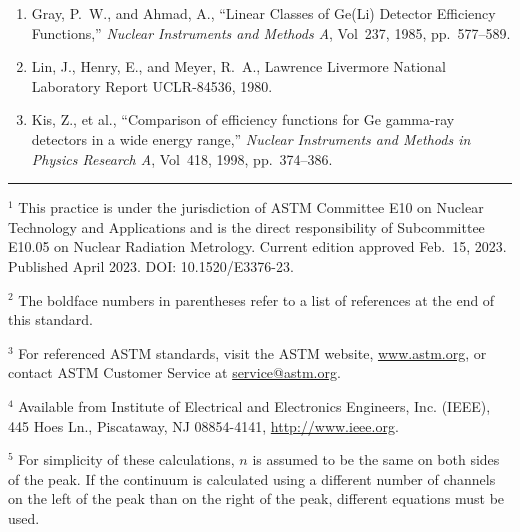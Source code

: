 \documentclass[12pt]{article}
\begin{document}
\begin{enumerate}[label=(\arabic*),leftmargin=3em]
  \item Gray, P.~W., and Ahmad, A., ``Linear Classes of Ge(Li) Detector Efficiency
        Functions,'' \textit{Nuclear Instruments and Methods A}, Vol~237, 1985,
        pp.~577--589.

  \item Lin, J., Henry, E., and Meyer, R.~A., Lawrence Livermore National Laboratory
        Report UCLR-84536, 1980.

  \item Kis, Z., et al., ``Comparison of efficiency functions for Ge gamma-ray detectors
        in a wide energy range,'' \textit{Nuclear Instruments and Methods in Physics
        Research A}, Vol~418, 1998, pp.~374--386.
\end{enumerate}

\vspace{2em}
\noindent\rule{\textwidth}{0.4pt}

\noindent\footnotesize
$^{1}$ This practice is under the jurisdiction of ASTM Committee E10 on Nuclear
Technology and Applications and is the direct responsibility of Subcommittee E10.05 on
Nuclear Radiation Metrology. Current edition approved Feb.~15, 2023. Published April
2023. DOI: 10.1520/E3376-23.

\noindent
$^{2}$ The boldface numbers in parentheses refer to a list of references at the end of
this standard.

\noindent
$^{3}$ For referenced ASTM standards, visit the ASTM website, \url{www.astm.org}, or
contact ASTM Customer Service at \href{mailto:service@astm.org}{service@astm.org}.

\noindent
$^{4}$ Available from Institute of Electrical and Electronics Engineers, Inc. (IEEE),
445 Hoes Ln., Piscataway, NJ 08854-4141, \url{http://www.ieee.org}.

\noindent
$^{5}$ For simplicity of these calculations, $n$ is assumed to be the same on both sides
of the peak. If the continuum is calculated using a different number of channels on the
left of the peak than on the right of the peak, different equations must be used.
\end{document}
